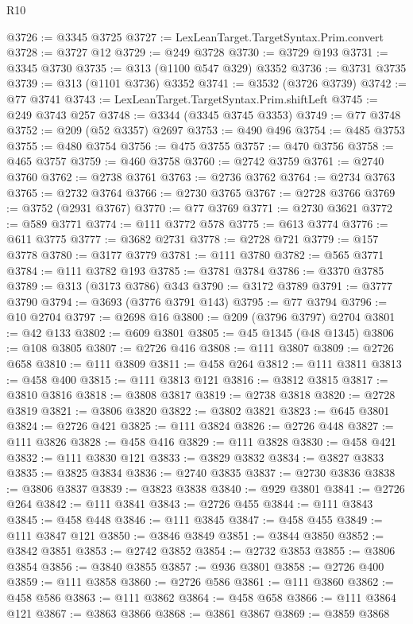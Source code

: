 \begin{lexlean}{R10}
\begin{coremodule}
@3726 := @3345 @3725
@3727 := LexLeanTarget.TargetSyntax.Prim.convert
@3728 := @3727 @12
@3729 := @249 @3728
@3730 := @3729 @193
@3731 := @3345 @3730
@3735 := @313 (@1100 @547 @329) @3352
@3736 := @3731 @3735
@3739 := @313 (@1101 @3736) @3352
@3741 := @3532 (@3726 @3739)
@3742 := @77 @3741
@3743 := LexLeanTarget.TargetSyntax.Prim.shiftLeft
@3745 := @249 @3743 @257
@3748 := @3344 (@3345 @3745 @3353)
@3749 := @77 @3748
@3752 := @209 (@52 @3357) @2697
@3753 := @490 @496
@3754 := @485 @3753
@3755 := @480 @3754
@3756 := @475 @3755
@3757 := @470 @3756
@3758 := @465 @3757
@3759 := @460 @3758
@3760 := @2742 @3759
@3761 := @2740 @3760
@3762 := @2738 @3761
@3763 := @2736 @3762
@3764 := @2734 @3763
@3765 := @2732 @3764
@3766 := @2730 @3765
@3767 := @2728 @3766
@3769 := @3752 (@2931 @3767)
@3770 := @77 @3769
@3771 := @2730 @3621
@3772 := @589 @3771
@3774 := @111 @3772 @578
@3775 := @613 @3774
@3776 := @611 @3775
@3777 := @3682 @2731
@3778 := @2728 @721
@3779 := @157 @3778
@3780 := @3177 @3779
@3781 := @111 @3780
@3782 := @565 @3771
@3784 := @111 @3782 @193
@3785 := @3781 @3784
@3786 := @3370 @3785
@3789 := @313 (@3173 @3786) @343
@3790 := @3172 @3789
@3791 := @3777 @3790
@3794 := @3693 (@3776 @3791 @143)
@3795 := @77 @3794
@3796 := @10 @2704
@3797 := @2698 @16
@3800 := @209 (@3796 @3797) @2704
@3801 := @42 @133
@3802 := @609 @3801
@3805 := @45 @1345 (@48 @1345)
@3806 := @108 @3805
@3807 := @2726 @416
@3808 := @111 @3807
@3809 := @2726 @658
@3810 := @111 @3809
@3811 := @458 @264
@3812 := @111 @3811
@3813 := @458 @400
@3815 := @111 @3813 @121
@3816 := @3812 @3815
@3817 := @3810 @3816
@3818 := @3808 @3817
@3819 := @2738 @3818
@3820 := @2728 @3819
@3821 := @3806 @3820
@3822 := @3802 @3821
@3823 := @645 @3801
@3824 := @2726 @421
@3825 := @111 @3824
@3826 := @2726 @448
@3827 := @111 @3826
@3828 := @458 @416
@3829 := @111 @3828
@3830 := @458 @421
@3832 := @111 @3830 @121
@3833 := @3829 @3832
@3834 := @3827 @3833
@3835 := @3825 @3834
@3836 := @2740 @3835
@3837 := @2730 @3836
@3838 := @3806 @3837
@3839 := @3823 @3838
@3840 := @929 @3801
@3841 := @2726 @264
@3842 := @111 @3841
@3843 := @2726 @455
@3844 := @111 @3843
@3845 := @458 @448
@3846 := @111 @3845
@3847 := @458 @455
@3849 := @111 @3847 @121
@3850 := @3846 @3849
@3851 := @3844 @3850
@3852 := @3842 @3851
@3853 := @2742 @3852
@3854 := @2732 @3853
@3855 := @3806 @3854
@3856 := @3840 @3855
@3857 := @936 @3801
@3858 := @2726 @400
@3859 := @111 @3858
@3860 := @2726 @586
@3861 := @111 @3860
@3862 := @458 @586
@3863 := @111 @3862
@3864 := @458 @658
@3866 := @111 @3864 @121
@3867 := @3863 @3866
@3868 := @3861 @3867
@3869 := @3859 @3868

\end{coremodule}
\end{lexlean}

